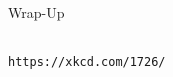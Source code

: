 \begin{frame}{Wrap-Up}
\begin{columns}
\begin{center}
	{\tiny
	 \texttt{https://xkcd.com/1726/}}
\end{center}
\end{columns}
%
\end{frame}